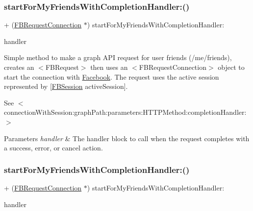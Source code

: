 \subsubsection{\texorpdfstring{start\+For\+My\+Friends\+With\+Completion\+Handler\+:()}{startForMyFriendsWithCompletionHandler:()}\hspace{0.1cm}{\footnotesize\ttfamily [2/5]}}
{\footnotesize\ttfamily + (\hyperlink{interfaceFBRequestConnection}{F\+B\+Request\+Connection} $\ast$) start\+For\+My\+Friends\+With\+Completion\+Handler\+: \begin{DoxyParamCaption}\item[{(F\+B\+Request\+Handler)}]{handler }\end{DoxyParamCaption}}

Simple method to make a graph A\+PI request for user friends (/me/friends), creates an $<$\+F\+B\+Request$>$ then uses an $<$\+F\+B\+Request\+Connection$>$ object to start the connection with \hyperlink{interfaceFacebook}{Facebook}. The request uses the active session represented by {\ttfamily \mbox{[}\hyperlink{interfaceFBSession}{F\+B\+Session} active\+Session\mbox{]}}.

See $<$connection\+With\+Session\+:graph\+Path\+:parameters\+:\+H\+T\+T\+P\+Method\+:completion\+Handler\+:$>$


\begin{DoxyParams}{Parameters}
{\em handler} & The handler block to call when the request completes with a success, error, or cancel action. \\
\hline
\end{DoxyParams}
\mbox{\label{interfaceFBRequestConnection_a1eeb9942474312db3197be0fa569bc60}} 
\subsubsection{\texorpdfstring{start\+For\+My\+Friends\+With\+Completion\+Handler\+:()}{startForMyFriendsWithCompletionHandler:()}\hspace{0.1cm}{\footnotesize\ttfamily [3/5]}}
{\footnotesize\ttfamily + (\hyperlink{interfaceFBRequestConnection}{F\+B\+Request\+Connection} $\ast$) start\+For\+My\+Friends\+With\+Completion\+Handler\+: \begin{DoxyParamCaption}\item[{(F\+B\+Request\+Handler)}]{handler }\end{DoxyParamCaption}}

